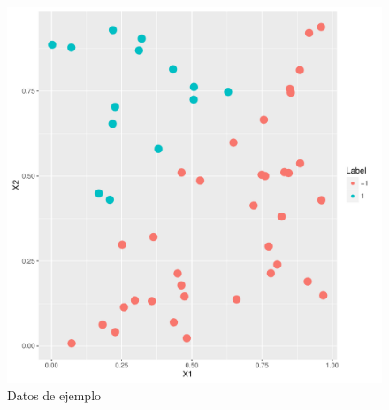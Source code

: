 \documentclass[a4paper,11pt]{book}\usepackage[]{graphicx}\usepackage[]{color}
\makeatletter
\def\maxwidth{ %
  \ifdim\Gin@nat@width>\linewidth
    \linewidth
  \else
    \Gin@nat@width
  \fi
}
\newenvironment{knitrout}{}{} %
\makeatother
\begin{document}
\begin{knitrout}
\color{fgcolor}\begin{figure}
\includegraphics[width=\maxwidth]{figure/dataExample-1} \caption[Datos de ejemplo]{Datos de ejemplo}\label{fig:dataExample}
\end{figure}


\end{knitrout}
\end{document}
